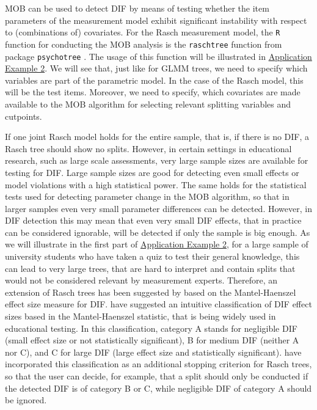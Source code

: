\documentclass[doc,floatsintext,natbib]{apa7}
\begin{document}
MOB can be used to detect DIF by means of testing whether the item parameters of the measurement model exhibit significant instability with respect to (combinations of) covariates. For the Rasch measurement model, the \texttt{R} function for conducting the MOB analysis is the \texttt{raschtree} function from package \texttt{psychotree} \citep{StroyKopf15}. The usage of this function will be illustrated in \hyperref[sec:TutorialRasch]{Application Example 2}. We will see that, just like for GLMM trees, we need to specify which variables are part of the parametric model. In the case of the Rasch model, this will be the test items. Moreover, we need to specify, which covariates are made available to the MOB algorithm for selecting relevant splitting variables and cutpoints. 

If one joint Rasch model holds for the entire sample, that is, if there is no DIF, a Rasch tree should show no splits. However, in certain settings in educational research, such as large scale assessments, very large sample sizes are available for testing for DIF. Large sample sizes are good for detecting even small effects or model violations with a high statistical power. The same holds for the statistical tests used for detecting parameter change in the MOB algorithm, so that in larger samples even very small parameter differences can be detected. However, in DIF detection this may mean that even very small DIF effects, that in practice can be considered ignorable, will be detected if only the sample is big enough. As we will illustrate in the first part of \hyperref[sec:TutorialRasch]{Application Example 2}, for a large sample of university students who have taken a quiz to test their general knowledge, this can lead to very large trees, that are hard to interpret and contain splits that would not be considered relevant by measurement experts. Therefore, an extension of Rasch trees has been suggested by \citet{HenDebStr:2023:EPM} based on the Mantel-Haenszel effect size measure for DIF. \citet{HolTha:1985} have suggested an intuitive classification of DIF effect sizes based in the Mantel-Haenszel statistic, that is being widely used in educational testing. In this classification, category A stands for negligible DIF (small effect size or not statistically significant), B for medium DIF (neither A nor C), and C for large DIF (large effect size and statistically significant). \citet{HenDebStr:2023:EPM} have incorporated this classification as an additional stopping criterion for Rasch trees, so that the user can decide, for example, that a split should only be conducted if the detected DIF is of category B or C, while negligible DIF of category A should be ignored. 
\end{document}
